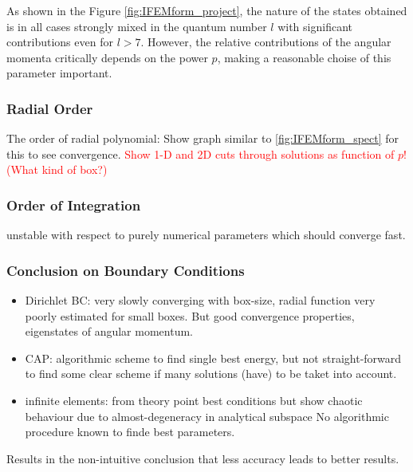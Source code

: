 As shown in the Figure \ref{fig:IFEMform_project}, the nature of the states obtained is in all cases strongly mixed in the quantum number $l$ with significant contributions even for $l>7$.
However, the relative contributions of the angular momenta critically depends on the power $p$, making a reasonable choise of this parameter important.

\subsubsection{Radial Order}
The order of radial polynomial: Show graph similar to \ref{fig:IFEMform_spect} for this to see convergence.
\textcolor{red}{Show 1-D and 2D cuts through solutions as function of $p$!  (What kind of box?)}

\subsubsection{Order of Integration}
unstable with respect to purely numerical parameters which should converge fast.

\subsubsection{Conclusion on Boundary Conditions}
\begin{itemize}
  \item Dirichlet BC: very slowly converging with box-size, radial function very poorly estimated for small boxes.
       But good convergence properties, eigenstates of angular momentum.
  \item CAP: algorithmic scheme to find single best energy, but not straight-forward to find some clear scheme if many solutions (have) to be taket into account.
  \item infinite elements: from theory point best conditions but show chaotic behaviour due to almost-degeneracy in analytical subspace No algorithmic procedure known to finde best parameters.
\end{itemize}
Results in the non-intuitive conclusion that less accuracy leads to better results.

